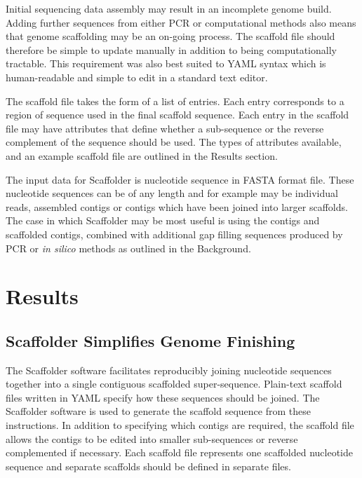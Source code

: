 \documentclass[10pt]{bmc_article}
\newenvironment{bmcformat}{\begin{raggedright}\baselineskip20pt\sloppy\setboolean{publ}{false}}{\end{raggedright}\baselineskip20pt\sloppy}
\begin{document}
\begin{bmcformat}
Initial sequencing data assembly may result in an incomplete genome build.
Adding further sequences from either PCR or computational methods also means
that genome scaffolding may be an on-going process. The scaffold file should
therefore be simple to update manually in addition to being computationally
tractable. This requirement was also best suited to YAML syntax which is
human-readable and simple to edit in a standard text editor. \pb

The scaffold file takes the form of a list of entries. Each entry corresponds
to a region of sequence used in the final scaffold sequence. Each entry in the
scaffold file may have attributes that define whether a sub-sequence or the
reverse complement of the sequence should be used. The types of attributes
available, and an example scaffold file are outlined in the Results section.
\pb

The input data for Scaffolder is nucleotide sequence in FASTA format file.
These nucleotide sequences can be of any length and for example may be
individual reads, assembled contigs or contigs which have been joined into
larger scaffolds. The case in which Scaffolder may be most useful is using the
contigs and scaffolded contigs, combined with additional gap filling sequences
produced by PCR or \emph{in silico} methods as outlined in the Background. \pb

\clearpage

\section*{Results} %

\subsection*{Scaffolder Simplifies Genome Finishing} %

The Scaffolder software facilitates reproducibly joining nucleotide sequences
together into a single contiguous scaffolded super-sequence. Plain-text
scaffold files written in YAML specify how these sequences should be joined.
The Scaffolder software is used to generate the scaffold sequence from these
instructions. In addition to specifying which contigs are required, the
scaffold file allows the contigs to be edited into smaller sub-sequences or
reverse complemented if necessary. Each scaffold file represents one scaffolded
nucleotide sequence and separate scaffolds should be defined in separate files.
\pb


\end{bmcformat}
\end{document}
